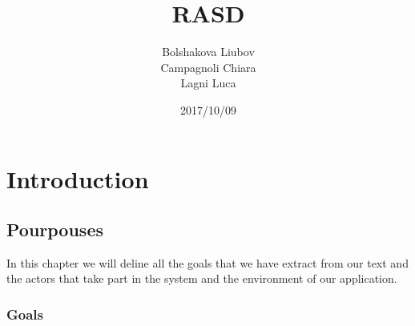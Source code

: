 \documentclass[a4paper]{book}
\begin{document}
\date{2017/10/09}
\author{Bolshakova Liubov\\ Campagnoli Chiara\\ Lagni Luca}
\title{RASD}
\frontmatter                            %
\maketitle                              %
\tableofcontents                        %
\mainmatter   

\part{Introduction}

\chapter{Pourpouses}
In this chapter we will deline all the goals that we have extract from our text and the actors that take part
in the system and the environment of our application.

\section{Goals}
\end{document}
